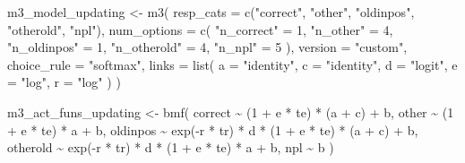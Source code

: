 \documentclass[
  man,
  floatsintext,
  longtable,
  nolmodern,
  notxfonts,
  notimes,
  colorlinks=true,linkcolor=blue,citecolor=blue,urlcolor=blue]{apa7}
\newenvironment{Shaded}{\begin{snugshade}}{\end{snugshade}}
\newcommand{\AttributeTok}[1]{\textcolor[rgb]{0.40,0.45,0.13}{#1}}
\newcommand{\DecValTok}[1]{\textcolor[rgb]{0.68,0.00,0.00}{#1}}
\newcommand{\FunctionTok}[1]{\textcolor[rgb]{0.28,0.35,0.67}{#1}}
\newcommand{\NormalTok}[1]{\textcolor[rgb]{0.00,0.23,0.31}{#1}}
\newcommand{\OtherTok}[1]{\textcolor[rgb]{0.00,0.23,0.31}{#1}}
\newcommand{\SpecialCharTok}[1]{\textcolor[rgb]{0.37,0.37,0.37}{#1}}
\newcommand{\StringTok}[1]{\textcolor[rgb]{0.13,0.47,0.30}{#1}}
\begin{document}
\begin{Shaded}
\begin{Highlighting}[]
\NormalTok{m3\_model\_updating }\OtherTok{\textless{}{-}} \FunctionTok{m3}\NormalTok{(}
  \AttributeTok{resp\_cats =} \FunctionTok{c}\NormalTok{(}\StringTok{"correct"}\NormalTok{, }\StringTok{"other"}\NormalTok{, }\StringTok{"oldinpos"}\NormalTok{, }\StringTok{"otherold"}\NormalTok{, }\StringTok{"npl"}\NormalTok{),}
  \AttributeTok{num\_options =} \FunctionTok{c}\NormalTok{(}
    \StringTok{"n\_correct"} \OtherTok{=} \DecValTok{1}\NormalTok{, }\StringTok{"n\_other"} \OtherTok{=} \DecValTok{4}\NormalTok{, }\StringTok{"n\_oldinpos"} \OtherTok{=} \DecValTok{1}\NormalTok{,}
    \StringTok{"n\_otherold"} \OtherTok{=} \DecValTok{4}\NormalTok{, }\StringTok{"n\_npl"} \OtherTok{=} \DecValTok{5}
\NormalTok{  ),}
  \AttributeTok{version     =} \StringTok{"custom"}\NormalTok{,}
  \AttributeTok{choice\_rule =} \StringTok{"softmax"}\NormalTok{,}
  \AttributeTok{links =} \FunctionTok{list}\NormalTok{(}
    \AttributeTok{a =} \StringTok{"identity"}\NormalTok{, }\AttributeTok{c =} \StringTok{"identity"}\NormalTok{,}
    \AttributeTok{d =} \StringTok{"logit"}\NormalTok{, }\AttributeTok{e =} \StringTok{"log"}\NormalTok{, }\AttributeTok{r =} \StringTok{"log"}
\NormalTok{  )}
\NormalTok{)}

\NormalTok{m3\_act\_funs\_updating }\OtherTok{\textless{}{-}} \FunctionTok{bmf}\NormalTok{(}
\NormalTok{  correct  }\SpecialCharTok{\textasciitilde{}}\NormalTok{ (}\DecValTok{1} \SpecialCharTok{+}\NormalTok{ e }\SpecialCharTok{*}\NormalTok{ te) }\SpecialCharTok{*}\NormalTok{ (a }\SpecialCharTok{+}\NormalTok{ c) }\SpecialCharTok{+}\NormalTok{ b,}
\NormalTok{  other    }\SpecialCharTok{\textasciitilde{}}\NormalTok{ (}\DecValTok{1} \SpecialCharTok{+}\NormalTok{ e }\SpecialCharTok{*}\NormalTok{ te) }\SpecialCharTok{*}\NormalTok{ a }\SpecialCharTok{+}\NormalTok{ b,}
\NormalTok{  oldinpos }\SpecialCharTok{\textasciitilde{}} \FunctionTok{exp}\NormalTok{(}\SpecialCharTok{{-}}\NormalTok{r }\SpecialCharTok{*}\NormalTok{ tr) }\SpecialCharTok{*}\NormalTok{ d }\SpecialCharTok{*}\NormalTok{ (}\DecValTok{1} \SpecialCharTok{+}\NormalTok{ e }\SpecialCharTok{*}\NormalTok{ te) }\SpecialCharTok{*}\NormalTok{ (a }\SpecialCharTok{+}\NormalTok{ c) }\SpecialCharTok{+}\NormalTok{ b,}
\NormalTok{  otherold }\SpecialCharTok{\textasciitilde{}} \FunctionTok{exp}\NormalTok{(}\SpecialCharTok{{-}}\NormalTok{r }\SpecialCharTok{*}\NormalTok{ tr) }\SpecialCharTok{*}\NormalTok{ d }\SpecialCharTok{*}\NormalTok{ (}\DecValTok{1} \SpecialCharTok{+}\NormalTok{ e }\SpecialCharTok{*}\NormalTok{ te) }\SpecialCharTok{*}\NormalTok{ a }\SpecialCharTok{+}\NormalTok{ b,}
\NormalTok{  npl      }\SpecialCharTok{\textasciitilde{}}\NormalTok{ b}
\NormalTok{)}
\end{Highlighting}
\end{Shaded}
\end{document}
